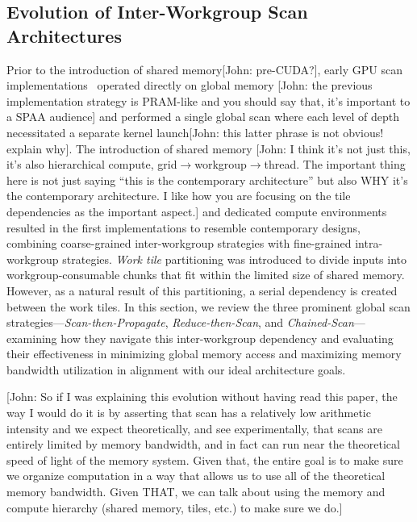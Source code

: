 \documentclass[sigconf]{acmart}
\newcommand{\john}[1]{{\footnotesize\color{cyan}[John: #1]}}
\begin{document}
\subsection{Evolution of Inter-Workgroup Scan Architectures}
Prior to the introduction of shared memory\john{pre-CUDA?}, early GPU scan implementations~\cite{Horn, Hensley, Greß, Sengupta} operated directly on global memory \john{the previous implementation strategy is PRAM-like and you should say that, it's important to a SPAA audience} and performed a single global scan where each level of depth necessitated a separate kernel launch\john{this latter phrase is not obvious! explain why}. The introduction of shared memory \john{I think it's not just this, it's also hierarchical compute, grid$\rightarrow$workgroup$\rightarrow$thread. The important thing here is not just saying ``this is the contemporary architecture'' but also WHY it's the contemporary architecture. I like how you are focusing on the tile dependencies as the important aspect.} and dedicated compute environments resulted in the first implementations to resemble contemporary designs, combining coarse-grained inter-workgroup strategies with fine-grained intra-workgroup strategies. \emph{Work tile} partitioning was introduced to divide inputs into workgroup-consumable chunks that fit within the limited size of shared memory. However, as a natural result of this partitioning, a serial dependency is created between the work tiles. In this section, we review the three prominent global scan strategies—\emph{Scan-then-Propagate}, \emph{Reduce-then-Scan}, and \emph{Chained-Scan}—examining how they navigate this inter-workgroup dependency and evaluating their effectiveness in minimizing global memory access and maximizing memory bandwidth utilization in alignment with our ideal architecture goals.

\john{So if I was explaining this evolution without having read this paper, the way I would do it is by asserting that scan has a relatively low arithmetic intensity and we expect theoretically, and see experimentally, that scans are entirely limited by memory bandwidth, and in fact can run near the theoretical speed of light of the memory system. Given that, the entire goal is to make sure we organize computation in a way that allows us to use all of the theoretical memory bandwidth. Given THAT, we can talk about using the memory and compute hierarchy (shared memory, tiles, etc.) to make sure we do.}
\end{document}
